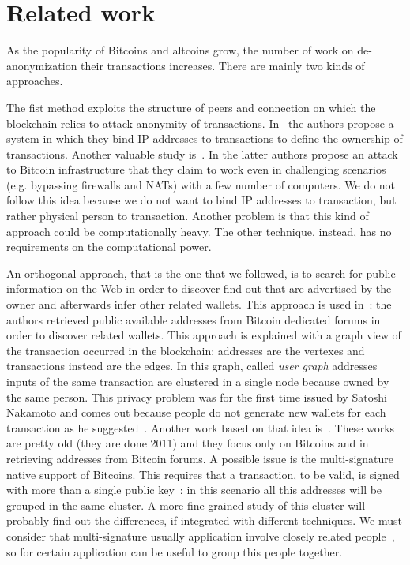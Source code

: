 \section{Related work} \label{relworks}
As the popularity of Bitcoins and altcoins grow, the number of work on
de-anonymization their transactions increases.
There are mainly two kinds of approaches.

The fist method exploits the structure of peers and connection on which the
blockchain relies to attack anonymity of transactions. In~\cite{bib:anonBitcoin}
the authors propose a system in which they bind IP addresses to transactions to
define the ownership of transactions. Another valuable study
is~\cite{bib:deanonP2P}. In the latter authors propose an attack to Bitcoin
infrastructure that they claim to work even in challenging scenarios (e.g.
bypassing firewalls and NATs) with a few number of computers. We do not follow
this idea because we do not want to bind IP addresses to transaction, but rather
physical person to transaction. Another problem is that this kind of approach
could be computationally heavy. The other technique, instead, has no
requirements on the computational power.

An orthogonal approach, that is the one that we followed, is to search for
public information on the Web in order to discover find out that are advertised
by the owner and afterwards infer other related wallets. This approach is used
in~\cite{bib:anonAnalysis}: the authors retrieved public available addresses from Bitcoin dedicated forums in order to discover related wallets. This approach is
explained with a graph view of the transaction occurred in the blockchain:
addresses are the vertexes and transactions instead are the edges. In this
graph, called \textit{user graph} addresses inputs of the same transaction are
clustered in a single node because owned by the same person. This privacy
problem was for the first time issued by Satoshi Nakamoto and comes out
because people do not generate new wallets for each transaction as he
suggested~\cite{bib:satoshi}. Another work based on that idea
is~\cite{bib:fistful}.
These works are pretty old (they are done 2011) and they focus only on Bitcoins
and in retrieving addresses from Bitcoin forums. A possible issue is the
multi-signature native support of Bitcoins. This requires that a transaction,
to be valid, is signed with more than a single public
key~\cite{bib:multisignature}: in this scenario all this addresses will be
grouped in the same cluster. A more fine grained study of this cluster will
probably find out the differences, if integrated with different techniques. We
must consider that multi-signature usually application involve closely related
people~\cite{bib:multisignaturebitcoinwiki}, so for certain application can be
useful to group this people together.

